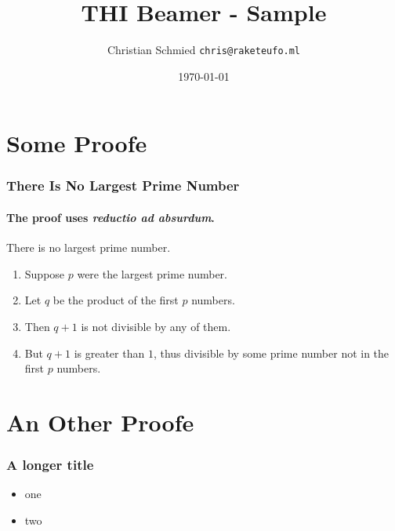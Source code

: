 \documentclass[aspectratio=169]{beamer}
\title{THI Beamer - Sample}
\date{\today}
\author{Christian Schmied \texttt{chris@raketeufo.ml}}
\begin{document}

\maketitle

\frame{\tableofcontents[hideallsubsections]}


\section{Some Proofe}
\begin{frame}
    \frametitle{There Is No Largest Prime Number} 
    \framesubtitle{The proof uses \textit{reductio ad absurdum}.} 
    \begin{theorem}
    There is no largest prime number.
    \end{theorem} 
    \begin{enumerate} 
    \item<1-| alert@1> Suppose $p$ were the largest prime number. 
    \item<2-> Let $q$ be the product of the first $p$ numbers. 
    \item<3-> Then $q+1$ is not divisible by any of them. 
    \item<1-> But $q + 1$ is greater than $1$, thus divisible by some prime
    number not in the first $p$ numbers.
    \end{enumerate}
\end{frame}

\section{An Other Proofe}  
\begin{frame}
    \frametitle{A longer title}
    \begin{itemize}
    \item one
    \item two
    \end{itemize}
\end{frame}
\end{document}

